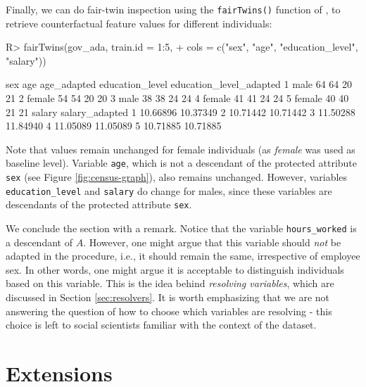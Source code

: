 \documentclass[
  nojss]{jss}
\begin{document}
Finally, we can do fair-twin inspection using the \texttt{fairTwins()}
function of , to retrieve counterfactual feature values
for different individuals:

\begin{CodeChunk}
\begin{CodeInput}
R> fairTwins(gov_ada, train.id = 1:5,
+           cols = c("sex", "age", "education_level", "salary"))
\end{CodeInput}
\begin{CodeOutput}
     sex age age_adapted education_level education_level_adapted
1   male  64          64              20                      21
2 female  54          54              20                      20
3   male  38          38              24                      24
4 female  41          41              24                      24
5 female  40          40              21                      21
    salary salary_adapted
1 10.66896       10.37349
2 10.71442       10.71442
3 11.50288       11.84940
4 11.05089       11.05089
5 10.71885       10.71885
\end{CodeOutput}
\end{CodeChunk}

Note that values remain unchanged for female individuals (as
\emph{female} was used as baseline level). Variable \texttt{age}, which
is not a descendant of the protected attribute \texttt{sex} (see Figure
\ref{fig:census-graph}), also remains unchanged. However, variables
\texttt{education\_level} and \texttt{salary} do change for males, since
these variables are descendants of the protected attribute \texttt{sex}.

We conclude the section with a remark. Notice that the variable
\texttt{hours\_worked} is a descendant of \(A\). However, one might
argue that this variable should \emph{not} be adapted in the procedure,
i.e., it should remain the same, irrespective of employee sex. In other
words, one might argue it is acceptable to distinguish individuals based
on this variable. This is the idea behind \emph{resolving variables},
which are discussed in Section \ref{sec:resolvers}. It is worth
emphasizing that we are not answering the question of how to choose
which variables are resolving - this choice is left to social scientists
familiar with the context of the dataset.

\hypertarget{sec:extensions}{%
\section{Extensions}\label{sec:extensions}}
\end{document}
